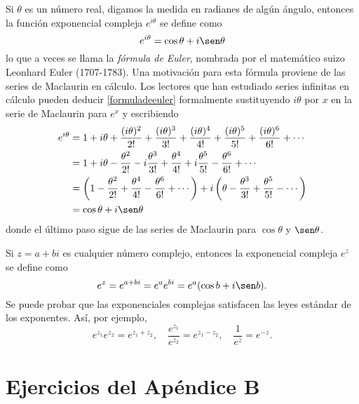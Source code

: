 Si $\theta$ es un número real, digamos la medida en radianes de algún ángulo, entonces la función exponencial compleja $e^{i\theta}$ se define como
\begin{equation}
    e^{i\theta} = \cos \theta + i \sen \theta \label{formuladeeuler}
\end{equation}
lo que a veces se llama la \emph{fórmula de Euler}, nombrada por el matemático suizo Leonhard Euler (1707-1783). Una motivación para esta fórmula proviene de las series de Maclaurin en cálculo. Los lectores que han estudiado series infinitas en cálculo pueden deducir \eqref{formuladeeuler} formalmente sustituyendo $i\theta$ por $x$ en la serie de Maclaurin para $e^x$ y escribiendo
\begin{align*}
    e^{i\theta} & = 1 + i\theta + \frac{(i\theta)^2}{2!} + \frac{(i\theta)^3}{3!} + \frac{(i\theta)^4}{4!} + \frac{(i\theta)^5}{5!} + \frac{(i\theta)^6}{6!} + \cdots \\
    & = 1 + i\theta - \frac{\theta^2}{2!} - i \frac{\theta^3}{3!} + \frac{\theta^4}{4!} + i \frac{\theta^5}{5!} - \frac{\theta^6}{6!} + \cdots \\
    & = \left( 1 - \frac{\theta^2}{2!} + \frac{\theta^4}{4!} - \frac{\theta^6}{6!} + \cdots \right) + i \left( \theta - \frac{\theta^3}{3!} + \frac{\theta^5}{5!} - \cdots \right) \\
    & = \cos \theta + i \sen \theta
\end{align*}
donde el último paso sigue de las series de Maclaurin para $\cos \theta$ y $\sen \theta$.

Si $z = a + bi$ es cualquier número complejo, entonces la exponencial compleja $e^z$ se define como
$$e^z = e^{a+bi} = e^a e^{bi} = e^a (\cos b + i \sen b).$$
Se puede probar que las exponenciales complejas satisfacen las leyes estándar de los exponentes. Así, por ejemplo,
$$e^{z_1} e^{z_2} = e^{z_1 + z_2}, \quad \frac{e^{z_1}}{e^{z_2}} = e^{z_1 - z_2}, \quad \frac{1}{e^z} = e^{-z}.$$

\newpage

\section{Ejercicios del Apéndice B}

